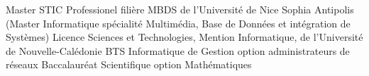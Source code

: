

\begin{scholarship}
					{Master STIC Professionel filière MBDS de l'Université de Nice Sophia Antipolis (Master Informatique spécialité Multimédia, Base de Données et intégration de Systèmes)}
					{Licence Sciences et Technologies, Mention Informatique, de l'Université de Nouvelle-Calédonie}
					{BTS Informatique de Gestion option administrateurs de réseaux}
					{Baccalauréat Scientifique option Mathématiques}
\end{scholarship}